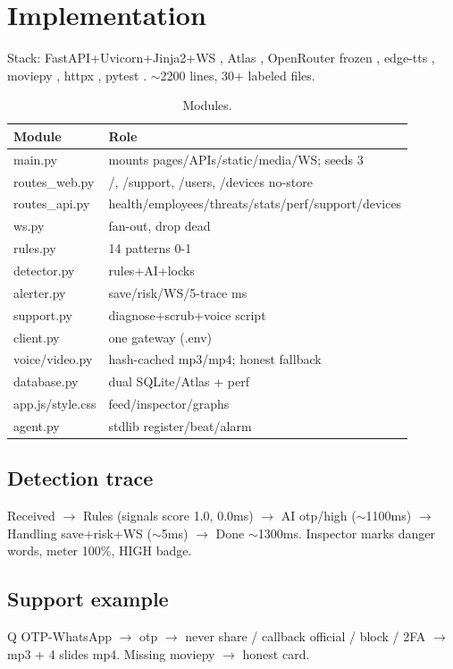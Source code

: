 \documentclass[11pt,a4paper]{article}
\begin{document}
\section{Implementation}
Stack: FastAPI+Uvicorn+Jinja2+WS \cite{FastAPI24}, Atlas \cite{Mongo24}, OpenRouter frozen \cite{Ji25}, edge-tts \cite{EdgeTTS24}, moviepy \cite{Moviepy24}, httpx \cite{HTTPX24}, pytest \cite{Pytest24}. $\sim$2200 lines, 30+ labeled files.
\begin{table}[h]\centering\caption{Modules.}\begin{tabular}{@{}lp{9cm}@{}} \toprule Module & Role\\\midrule main.py & mounts pages/APIs/static/media/WS; seeds 3\\
routes\_web.py & /, /support, /users, /devices no-store\\
routes\_api.py & health/employees/threats/stats/perf/support/devices\\
ws.py & fan-out, drop dead\\
rules.py & 14 patterns 0-1\\
detector.py & rules+AI+locks\\
alerter.py & save/risk/WS/5-trace ms\\
support.py & diagnose+scrub+voice script\\
client.py & one gateway (.env)\\
voice/video.py & hash-cached mp3/mp4; honest fallback\\
database.py & dual SQLite/Atlas + perf\\
app.js/style.css & feed/inspector/graphs\\
agent.py & stdlib register/beat/alarm\\\bottomrule\end{tabular}\end{table}
\subsection{Detection trace}
Received $\rightarrow$ Rules (signals score 1.0, 0.0ms) $\rightarrow$ AI otp/high ($\sim$1100ms) $\rightarrow$ Handling save+risk+WS ($\sim$5ms) $\rightarrow$ Done $\sim$1300ms. Inspector marks danger words, meter 100\%, HIGH badge.
\subsection{Support example}
Q OTP-WhatsApp $\rightarrow$ otp $\rightarrow$ never share / callback official / block / 2FA $\rightarrow$ mp3 + 4 slides mp4. Missing moviepy $\rightarrow$ honest card.
\end{document}
